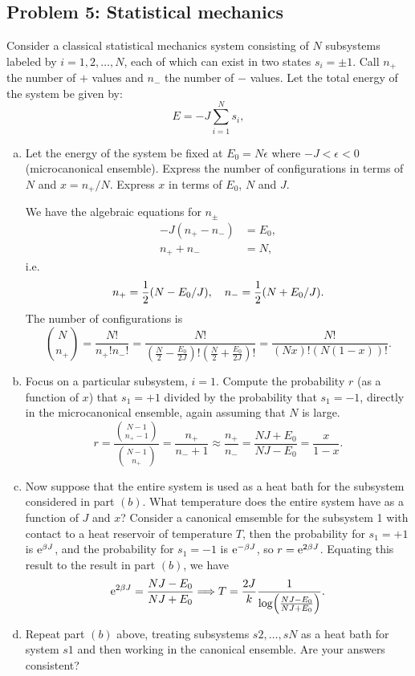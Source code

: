\documentclass[10pt]{article}
\begin{document}
\subsection{Problem 5: Statistical mechanics}
Consider a classical statistical mechanics system consisting of $N$ subsystems labeled by $i = 1, 2,\dots, N$, each of which can exist in two states $s_i = \pm 1$. Call $n_+$ the number of $+$ values and $n_-$ the number of $-$ values. Let the total energy of the system be given by:
\begin{equation}
	E = -J \sum_{i=1}^N s_i,
\end{equation}
\begin{enumerate}[(a)]
	\item Let the energy of the system be fixed at $E_0 = N \epsilon$ where $-J < \epsilon < 0$ (microcanonical ensemble). Express the number of configurations in terms of $N$ and $x = n_+/N$. Express $x$ in terms of $E_0$, $N$ and $J$.

			We have the algebraic equations for $n_{\pm}$ 
	\begin{align}
		-J (n_+ - n_-) &= E_0, \\
		n_+ + n_- &= N, 
	\end{align}
	i.e.
	\begin{equation}
		n_+ = \frac{1}{2}(N- E_0 / J)\qc n_- = \frac{1}{2}(N + E_0 / J).
	\end{equation}
	The number of configurations is 
	\begin{equation}
		\binom{N}{n_+} = \frac{N!}{n_+! n_-!} = \frac{N!}{(\frac{N}{2} - \frac{E_0}{2J})! (\frac{N}{2} + \frac{E_0}{2J})!} = \frac{N!}{(Nx)!(N(1-x))!} .
	\end{equation}
	\item Focus on a particular subsystem, $i = 1$. Compute the probability $r$ (as a function of $x$) that $s_1 = +1$ divided by the probability that $s_1 = -1$, directly in the microcanonical ensemble, again assuming that $N$ is large.
		\begin{equation}
			r = \frac{\binom{N-1}{n_+ - 1}}{\binom{N-1}{n_+}} = \frac{n_+}{n_-+1} \approx \frac{n_+}{n_-} = \frac{NJ + E_0}{NJ - E_0} = \frac{x}{1-x}.
		\end{equation}
	\item Now suppose that the entire system is used as a heat bath for the subsystem considered in part $(b)$. What temperature does the entire system have as a function of $J$ and $x$?
		Consider a canonical emsemble for the subsystem 1 with contact to a heat reservoir of temperature $T$, then the probability for $s_1 = +1$ is ${\mathrm{e}}^{\beta J}$, and the probability for $s_1 = -1$ is ${\mathrm{e}}^{-\beta J}$, so $r = {\mathrm{e}}^{2\beta J}$. Equating this result to the result in part $(b)$, we have 
		\begin{equation}
			{\mathrm{e}}^{2\beta J} = \frac{NJ - E_0}{NJ + E_0}\Longrightarrow T = \frac{2J}{k} \frac{1}{\log(\frac{NJ - E_0}{NJ + E_0})}.
		\end{equation}
	\item Repeat part $(b)$ above, treating subsystems $s2,\dots, sN$ as a heat bath for system $s1$ and then working in the canonical ensemble. Are your answers consistent?


\end{enumerate}
\end{document}
